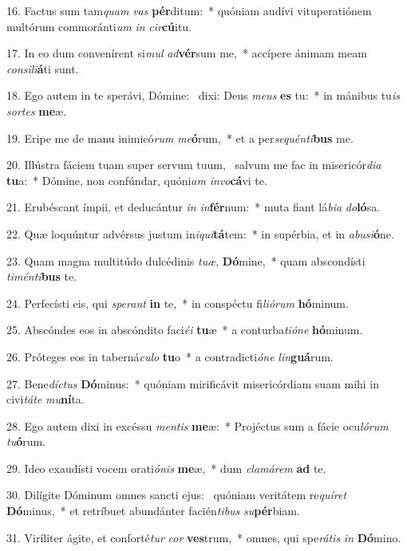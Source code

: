 16. Factus sum tam\textit{quam} \textit{vas} \textbf{pér}ditum:~*  quóniam audívi vituperatiónem multórum commoránti\textit{um} \textit{in} \textit{cir}\textbf{cú}itu.\

17. In eo dum convenírent si\textit{mul} \textit{ad}\textbf{vér}sum me,~*  accípere ánimam meam \textit{con}\textit{si}\textit{li}\textbf{á}ti sunt.\

18. Ego autem in te sperávi, Dómine: \dag\  dixi: Deus \textit{me}\textit{us} \textbf{es} tu:~*  in mánibus tu\textit{is} \textit{sor}\textit{tes} \textbf{me}æ.\

19. Eripe me de manu inimicó\textit{rum} \textit{me}\textbf{ó}rum,~*  et a per\textit{se}\textit{quén}\textit{ti}\textbf{bus} me.\

20. Illústra fáciem tuam super servum tuum, \dag\  salvum me fac in misericór\textit{di}\textit{a} \textbf{tu}a:~*  Dómine, non confúndar, quóni\textit{am} \textit{in}\textit{vo}\textbf{cá}vi te.\

21. Erubéscant ímpii, et deducántur \textit{in} \textit{in}\textbf{fér}num:~*  muta fiant lá\textit{bi}\textit{a} \textit{do}\textbf{ló}sa.\

22. Quæ loquúntur advérsus justum in\textit{i}\textit{qui}\textbf{tá}tem:~*  in supérbia, et in \textit{ab}\textit{u}\textit{si}\textbf{ó}ne.\

23. Quam magna multitúdo dulcédinis \textit{tu}\textit{æ}, \textbf{Dó}mine,~*  quam abscondísti \textit{ti}\textit{mén}\textit{ti}\textbf{bus} te.\

24. Perfecísti eis, qui \textit{spe}\textit{rant} \textbf{in} te,~*  in conspéctu fi\textit{li}\textit{ó}\textit{rum} \textbf{hó}minum.\

25. Abscóndes eos in abscóndito faci\textit{é}\textit{i} \textbf{tu}æ~*  a conturba\textit{ti}\textit{ó}\textit{ne} \textbf{hó}minum.\

26. Próteges eos in taberná\textit{cu}\textit{lo} \textbf{tu}o~*  a contradicti\textit{ó}\textit{ne} \textit{lin}\textbf{guá}rum.\

27. Bene\textit{díc}\textit{tus} \textbf{Dó}minus:~*  quóniam mirificávit misericórdiam suam mihi in civi\textit{tá}\textit{te} \textit{mu}\textbf{ní}ta.\

28. Ego autem dixi in excéssu \textit{men}\textit{tis} \textbf{me}æ:~*  Projéctus sum a fácie ocu\textit{ló}\textit{rum} \textit{tu}\textbf{ó}rum.\

29. Ideo exaudísti vocem orati\textit{ó}\textit{nis} \textbf{me}æ,~*  dum \textit{cla}\textit{má}\textit{rem} \textbf{ad} te.\

30. Dilígite Dóminum omnes sancti ejus: \dag\  quóniam veritátem re\textit{quí}\textit{ret} \textbf{Dó}minus,~*  et retríbuet abundánter facién\textit{ti}\textit{bus} \textit{su}\textbf{pér}biam.\

31. Viríliter ágite, et conforté\textit{tur} \textit{cor} \textbf{ves}trum,~*  omnes, qui spe\textit{rá}\textit{tis} \textit{in} \textbf{Dó}mino.\

